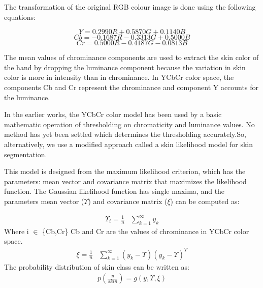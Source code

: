 \documentclass[conference]{IEEEtran}
\begin{document}
The transformation of the original RGB colour image is done using
the following equations:

\begin{equation}
 Y = 0.2990R + 0.5870G + 0.1140B
\end{equation}
\begin{equation}
 Cb = -0.1687R - 0.3313G + 0.5000B
\end{equation}
\begin{equation}
 Cr = 0.5000R - 0.4187G - 0.0813B
\end{equation}


The mean values of chrominance components are used to extract the skin color of the hand by dropping the luminance component because the variation in skin color is more in intensity than in chrominance. In YCbCr color space, the components Cb and Cr represent the chrominance and component Y accounts for the luminance.

In the earlier works, the YCbCr color model has been used by a basic mathematic operation of thresholding on chromaticity and luminance values. No method has yet been settled which determines the thresholding accurately.So, alternatively, we use a modified approach called a skin likelihood model for skin segmentation.

This model is designed from the maximum likelihood criterion, which has the parameters: mean vector and covariance matrix that maximizes the likelihood function. The Gaussian likelihood function \cite{vishwakarma2015efficient} has single maxima, and the parameters mean vector ($\Upsilon$) and covariance matrix ($\xi$) can be computed as:

\begin{equation}
\begin{aligned}
\Upsilon_i = \frac{1}{n} & \sum_{k=1}^\infty y_k
\end{aligned}
\end{equation}
Where i $\in$ \{Cb,Cr\}  Cb and Cr are the values of chrominance in YCbCr color space.
\begin{equation}
\begin{aligned}
\xi = \frac{1}{n} & \sum_{k=1}^\infty \left(y_k - \Upsilon \right)\left(y_k - \Upsilon \right)^T
\end{aligned}
\end{equation}
The probability distribution of skin class can be written as:
\begin{equation}
\begin{aligned}
p(\frac{y}{skin}) =  g(y,\Upsilon,\xi)
\end{aligned}
\end{equation}
\end{document}
